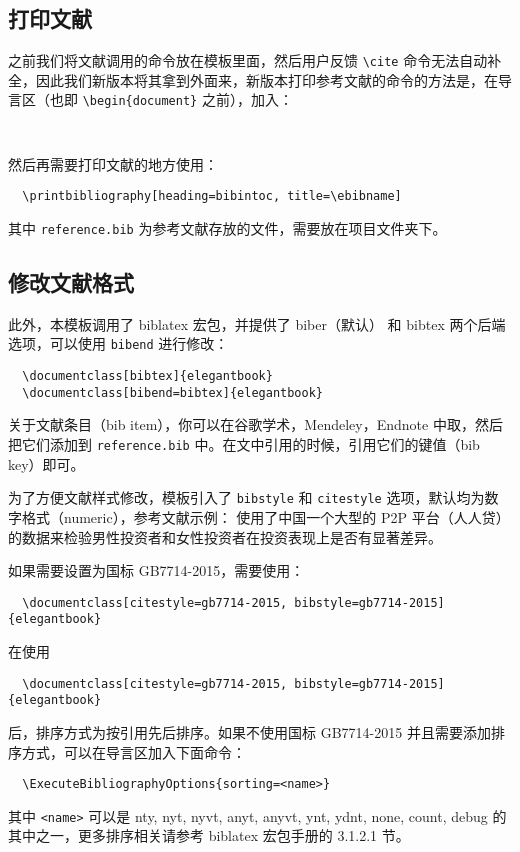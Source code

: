 \documentclass[lang=cn,newtx,10pt,scheme=chinese,color=black]{elegantbook}
\begin{document}
\subsection{打印文献}

之前我们将文献调用的命令放在模板里面，然后用户反馈 \lstinline{\cite} 命令无法自动补全，因此我们新版本将其拿到外面来，新版本打印参考文献的命令的方法是，在导言区（也即 \lstinline|\begin{document}| 之前），加入：

\begin{lstlisting}
  
\end{lstlisting}

然后再需要打印文献的地方使用：
\begin{lstlisting}
  \printbibliography[heading=bibintoc, title=\ebibname]
\end{lstlisting}

其中 \lstinline{reference.bib} 为参考文献存放的文件，需要放在项目文件夹下。

\subsection{修改文献格式}

此外，本模板调用了 biblatex 宏包，并提供了 biber（默认） 和 bibtex 两个后端选项，可以使用 \lstinline{bibend} 进行修改：

\begin{lstlisting}
  \documentclass[bibtex]{elegantbook}
  \documentclass[bibend=bibtex]{elegantbook}
\end{lstlisting}

关于文献条目（bib item），你可以在谷歌学术，Mendeley，Endnote 中取，然后把它们添加到 \lstinline{reference.bib} 中。在文中引用的时候，引用它们的键值（bib key）即可。

为了方便文献样式修改，模板引入了 \lstinline{bibstyle} 和 \lstinline{citestyle} 选项，默认均为数字格式（numeric），参考文献示例：\cite{cn1,en2,en3} 使用了中国一个大型的 P2P 平台（人人贷）的数据来检验男性投资者和女性投资者在投资表现上是否有显著差异。

如果需要设置为国标 GB7714-2015，需要使用：
\begin{lstlisting}
  \documentclass[citestyle=gb7714-2015, bibstyle=gb7714-2015]{elegantbook} 
\end{lstlisting}

在使用
\begin{lstlisting}
  \documentclass[citestyle=gb7714-2015, bibstyle=gb7714-2015]{elegantbook} 
\end{lstlisting}
后，排序方式为按引用先后排序。如果不使用国标 GB7714-2015 并且需要添加排序方式，可以在导言区加入下面命令：
\begin{lstlisting}
  \ExecuteBibliographyOptions{sorting=<name>}
\end{lstlisting}
其中 \lstinline{<name>} 可以是 nty, nyt, nyvt, anyt, anyvt, ynt, ydnt, none, count, debug 的其中之一，更多排序相关请参考 biblatex 宏包手册的 3.1.2.1 节。
\end{document}
